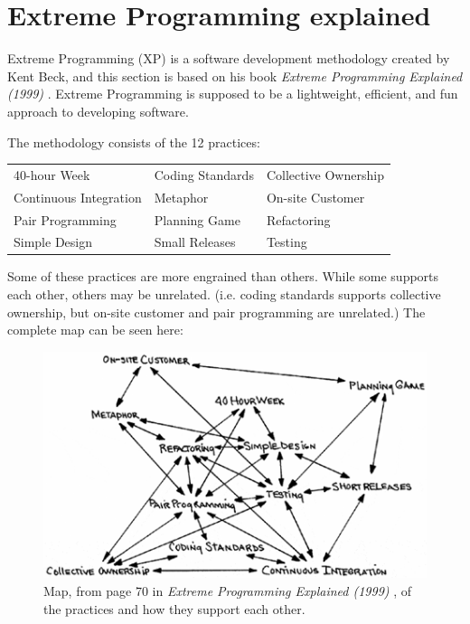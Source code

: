 \section{Extreme Programming explained}
Extreme Programming (XP) is a software development methodology created by Kent Beck, and this section is based on his book \textit{Extreme Programming Explained (1999)} \citep{xp:explained}. 
Extreme Programming is supposed to be a lightweight, efficient, and fun approach to developing software.

\noindent The methodology consists of the 12 practices:

\begin{tabularx}{\textwidth}{X X X}
	40-hour Week				 & Coding Standards & Collective Ownership \\
	Continuous Integration	  & Metaphor         	 & On-site Customer     \\
	Pair Programming			& Planning Game		& Refactoring          \\
	Simple Design          		  & Small Releases   	& Testing             
\end{tabularx}

Some of these practices are more engrained than others. 
While some supports each other, others may be unrelated. (i.e. coding standards supports collective ownership, but on-site customer and pair programming are unrelated.) The complete map can be seen here:
\begin{figure}[H]
	\centering
	\includegraphics[]{Images/xpPracticeSupport.png}
		\caption{Map, from page 70 in \textit{Extreme Programming Explained (1999)} \citep{xp:explained}, of the practices and how they support each other. }
	\label{fig:practiceSupport}
\end{figure}



